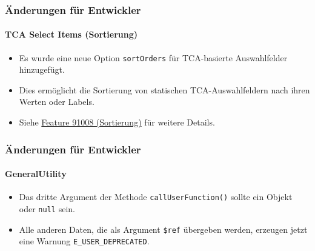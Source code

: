 
\begin{frame}[fragile]
	\frametitle{Änderungen für Entwickler}
	\framesubtitle{TCA Select Items (Sortierung)}

	\begin{itemize}
		\item Es wurde eine neue Option \texttt{sortOrders} für TCA-basierte Auswahlfelder hinzugefügt.
		\item Dies ermöglicht die Sortierung von statischen TCA-Auswahlfeldern nach ihren Werten oder Labels.
		\item Siehe
			\href{https://docs.typo3.org/c/typo3/cms-core/master/en-us/Changelog/10.4/Feature-91008-ItemSortingForTCASelectItems.html}{Feature 91008 (Sortierung)}
			für weitere Details.
	\end{itemize}

\end{frame}


\begin{frame}[fragile]
	\frametitle{Änderungen für Entwickler}
	\framesubtitle{GeneralUtility}

	\begin{itemize}
		\item Das dritte Argument der Methode \texttt{callUserFunction()}
			sollte ein Objekt oder \texttt{null} sein.
		\item Alle anderen Daten, die als Argument \texttt{\$ref} übergeben werden,
			erzeugen jetzt eine Warnung \texttt{E\_USER\_DEPRECATED}.
	\end{itemize}

\end{frame}


